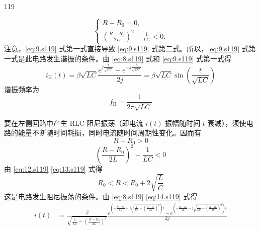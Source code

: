 \begin{solution}{119}
\begin{subsolution}
        \begin{equation}
            \left\{ \begin{array}{l} R - R_{0} = 0, \\ \left(\frac{R - R_{0}}{2L}\right)^{2} - \frac{1}{LC} < 0. \end{array} \right.
            \label{eq:9.s119}
        \end{equation}
        注意，\eqref{eq:9.s119} 式第一式直接导致 \eqref{eq:9.s119} 式第二式。所以，\eqref{eq:9.s119} 式第一式是此电路发生谐振的条件。由 \eqref{eq:8.s119} 式和 \eqref{eq:9.s119} 式第一式得
        \begin{equation}
            i_{\mathrm{H}}(t) = \beta \sqrt{LC} \frac{e^{j \frac{t}{\sqrt{LC}}} - e^{-j \frac{t}{\sqrt{LC}}}}{2j} = \beta \sqrt{LC} \sin \left(\frac{t}{\sqrt{LC}}\right)
            \label{eq:10.s119}
        \end{equation}
        谐振频率为
        \begin{equation}
            f_{\mathrm{H}} = \frac{1}{2 \pi \sqrt{LC}}
            \label{eq:11.s119}
        \end{equation}
    \end{subsolution}
    \begin{subsolution}
        要在左侧回路中产生 RLC 阻尼振荡（即电流 $i(t)$ 振幅随时间 $t$ 衰减），须使电路的能量不断随时间耗损，同时电流随时间周期性变化。因而有
        \begin{equation}
            R - R_{0} > 0
            \label{eq:12.s119}
        \end{equation}
        \begin{equation}
            \left(\frac{R - R_{0}}{2L}\right)^{2} - \frac{1}{LC} < 0
            \label{eq:13.s119}
        \end{equation}
        由 \eqref{eq:12.s119} \eqref{eq:13.s119} 式得
        \begin{equation}
            R_{0} < R < R_{0} + 2 \sqrt{\frac{L}{C}}
            \label{eq:14.s119}
        \end{equation}
        这是电路发生阻尼振荡的条件。由 \eqref{eq:8.s119} \eqref{eq:14.s119} 式得
        \begin{align}
            i(t) &= \frac{\beta}{\sqrt{\frac{1}{LC} - \left(\frac{R - R_{0}}{2L}\right)^{2}}} \frac{e^{\left(-\frac{R - R_{0}}{2L} + j \sqrt{\frac{1}{LC} - \left(\frac{R - R_{0}}{2L}\right)^{2}}\right) t} - e^{\left(-\frac{R - R_{0}}{2L} - j \sqrt{\frac{1}{LC} - \left(\frac{R - R_{0}}{2L}\right)^{2}}\right) t}}{2j} \nonumber \\

\end{align}
\end{subsolution}
\end{solution}

